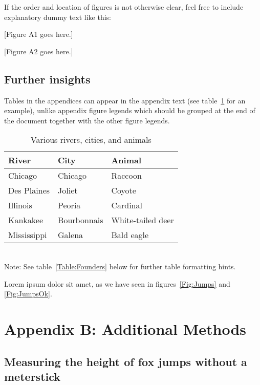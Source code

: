 \documentclass[11pt]{article}
\begin{document}
If the order and location of figures is not otherwise clear, feel free to include explanatory dummy text like this:

[Figure A1 goes here.]

[Figure A2 goes here.]

\subsection*{Further insights}

Tables in the appendices can appear in the appendix text (see table~\ref{Table:Rivers} for an example), unlike appendix figure legends which should be grouped at the end of the document together with the other figure legends.

\begin{table}[h]
\caption{Various rivers, cities, and animals}
\label{Table:Rivers}
\centering
\begin{tabular}{lll}\hline
River        & City        & Animal            \\ \hline
Chicago      & Chicago     & Raccoon           \\
Des Plaines  & Joliet      & Coyote            \\
Illinois     & Peoria      & Cardinal          \\
Kankakee     & Bourbonnais & White-tailed deer \\
Mississippi  & Galena      & Bald eagle        \\ \hline
\end{tabular}
\bigskip{}
\\
{\footnotesize Note: See table~\ref{Table:Founders} below for further table formatting hints.}
\end{table}

Lorem ipsum dolor sit amet, as we have seen in figures~\ref{Fig:Jumps} and \ref{Fig:JumpsOk}.

\newpage{}
\renewcommand{\theequation}{B\arabic{equation}}
\renewcommand{\thetable}{B\arabic{table}}
\setcounter{equation}{0}  %
\setcounter{table}{0}

\section*{Appendix B: Additional Methods}

\subsection*{Measuring the height of fox jumps without a meterstick}
\end{document}
